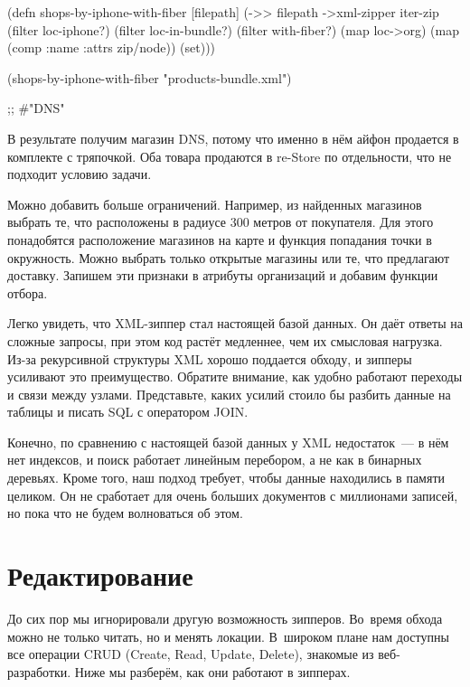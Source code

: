 \begin{english}
  \begin{clojure}
(defn shops-by-iphone-with-fiber [filepath]
  (->> filepath
       ->xml-zipper
       iter-zip
       (filter loc-iphone?)
       (filter loc-in-bundle?)
       (filter with-fiber?)
       (map loc->org)
       (map (comp :name :attrs zip/node))
       (set)))

(shops-by-iphone-with-fiber "products-bundle.xml")

;; #{"DNS"}
  \end{clojure}
\end{english}

В результате получим магазин DNS, потому что именно в нём айфон продается в
комплекте с тряпочкой. Оба товара продаются в re-Store по отдельности, что не
подходит условию задачи.

Можно добавить больше ограничений. Например, из найденных магазинов выбрать те,
что расположены в радиусе 300 метров от покупателя. Для этого понадобятся
расположение магазинов на карте и функция попадания точки в окружность. Можно
выбрать только открытые магазины или те, что предлагают доставку. Запишем эти
признаки в атрибуты организаций и добавим функции отбора.

Легко увидеть, что XML-зиппер стал настоящей базой данных. Он даёт ответы на
сложные запросы, при этом код растёт медленнее, чем их смысловая нагрузка. Из-за
рекурсивной структуры XML хорошо поддается обходу, и зипперы усиливают это
преимущество. Обратите внимание, как удобно работают переходы и связи между
узлами. Представьте, каких усилий стоило бы разбить данные на таблицы и писать
SQL с оператором JOIN.

Конечно, по сравнению с настоящей базой данных у XML недостаток~--- в нём нет
индексов, и поиск работает линейным перебором, а не как в бинарных
деревьях. Кроме того, наш подход требует, чтобы данные находились в памяти
целиком. Он не сработает для очень больших документов с миллионами записей, но
пока что не будем волноваться об этом.

\section{Редактирование}

До сих пор мы игнорировали другую возможность зипперов. Во~время обхода можно не
только читать, но и менять локации. В~широком плане нам доступны все операции
CRUD (Create, Read, Update, Delete), знакомые из веб-разработки. Ниже мы
разберём, как они работают в зипперах.

